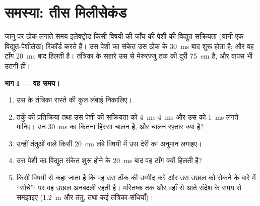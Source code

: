 \section{समस्या: तीस मिलीसेकंड}

\begin{problem}
\label{pb:g12:stretch-reflex:1}
जानु  पर ठोंक लगाते समय इलेक्ट्रोड किसी विषयी की जाँघ की पेशी की विद्युत
सक्रियता (यानी एक विद्युत-पेशीलेख) रिकॉर्ड करते हैं। उस पेशी का संकेत उस ठोंक
के \qty{30}{ms} बाद शुरू होता है; और वह टाँग \qty{20}{ms} बाद हिलती है।
तंत्रिका के सहारे उस  से मेरुरज्जु तक की दूरी \qty{75}{cm} है, और वापस
भी उतनी ही।

\medskip
\noindent\textbf{भाग I --- वह समय।}
\begin{enumerate}
  \item उस  के तंत्रिका रास्ते की कुल लंबाई निकालिए।
  \item तर्कु की प्रतिक्रिया तथा उस पेशी की सक्रियता को \qty{4}{ms}-\qty{4}{ms}
        और उस  को \qty{1}{ms} लगते मानिए। उन \qty{30}{ms} का
        कितना हिस्सा चालन है, और चालन रफ़्तार क्या है?
  \item उन्हीं तंतुओं वाले किसी \qty{20}{cm} लंबे विषयी में उस देरी का
        अनुमान लगाइए।
  \item उस पेशी का विद्युत संकेत शुरू होने के \qty{20}{ms} बाद वह टाँग
        क्यों हिलती है?
  \item किसी विषयी से कहा जाता है कि वह उस ठोंक की उम्मीद करे और उस उछाल को
        रोकने के बारे में ``सोचे''; पर वह उछाल अनबदली रहती है। मस्तिष्क तक
        और वहाँ से आते संदेश के समय से समझाइए (\qty{1.2}{m} और तंतु, तथा
        कई तंत्रिका-संधियाँ)।
\end{enumerate}


\end{problem}
